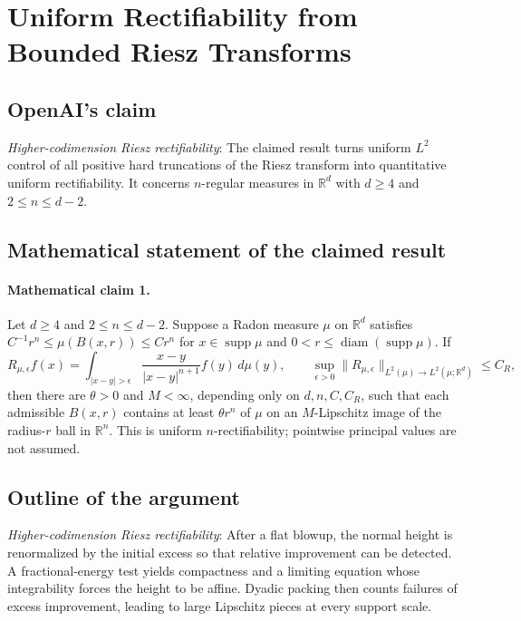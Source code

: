 \documentclass[11pt]{article}
\begin{document}
\section*{Uniform Rectifiability from Bounded Riesz Transforms}

\subsection{OpenAI's claim}
\textit{Higher-codimension Riesz rectifiability}: The claimed result turns uniform $L^2$ control of all positive hard truncations of the Riesz transform into quantitative uniform rectifiability. It concerns $n$-regular measures in $\mathbb R^d$ with $d\ge4$ and $2\le n\le d-2$.

\subsection{Mathematical statement of the claimed result}
\paragraph{Mathematical claim 1.} Let $d\ge4$ and $2\le n\le d-2$. Suppose a Radon measure $\mu$ on $\mathbb R^d$ satisfies $C^{-1}r^n\le\mu(B(x,r))\le Cr^n$ for $x\in\operatorname{supp}\mu$ and $0<r\le\operatorname{diam}(\operatorname{supp}\mu)$. If \[R_{\mu,\epsilon}f(x)=\int_{|x-y|>\epsilon}\frac{x-y}{|x-y|^{n+1}}f(y)\,d\mu(y),\qquad\sup_{\epsilon>0}\|R_{\mu,\epsilon}\|_{L^2(\mu)\to L^2(\mu;\mathbb R^d)}\le C_R,\] then there are $\theta>0$ and $M<\infty$, depending only on $d,n,C,C_R$, such that each admissible $B(x,r)$ contains at least $\theta r^n$ of $\mu$ on an $M$-Lipschitz image of the radius-$r$ ball in $\mathbb R^n$. This is uniform $n$-rectifiability; pointwise principal values are not assumed.

\subsection{Outline of the argument}
\textit{Higher-codimension Riesz rectifiability}: After a flat blowup, the normal height is renormalized by the initial excess so that relative improvement can be detected. A fractional-energy test yields compactness and a limiting equation whose integrability forces the height to be affine. Dyadic packing then counts failures of excess improvement, leading to large Lipschitz pieces at every support scale.
\end{document}
